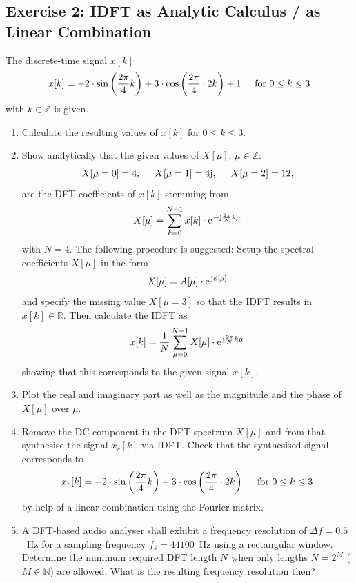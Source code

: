 \documentclass[11pt,a4paper,DIV=12]{scrartcl}
\begin{document}
\subsection*{Exercise 2: IDFT as Analytic Calculus / as Linear Combination}
The discrete-time signal $x[k]$
\begin{equation}
x[k]=-2\cdot\sin\left(\frac{2\pi}{4}k\right)+3\cdot\cos\left(\frac{2\pi}{4}\cdot2k\right)+1
\hspace{5mm}\text{for}\,\,0\leq k\leq3
\end{equation}
with $k\in\mathbb{Z}$ is given.
\begin{enumerate}[label=\alph*)]
	\item Calculate the resulting values of $x[k]$ for $0\leq k\leq3$.
%
	\item Show analytically that the given values of $X[\mu]$, $\mu\in\mathbb{Z}$:
	\begin{equation}
	X[\mu=0]=4, \hspace{5mm} X[\mu=1]=4\im, \hspace{5mm} X[\mu=2]=12,
	\end{equation}
	are the DFT coefficients of $x[k]$ stemming from
	\begin{equation}
	X[\mu]=\sum_{k=0}^{N-1}x[k]\cdot\e^{-\im\frac{2\pi}{N}k\mu}
	\end{equation}
	with $N=4$.
%
	The following procedure is suggested: Setup the spectral
	coefficients $X[\mu]$ in the form
	\begin{equation}
	X[\mu]=A[\mu]\cdot\e^{\im\phi[\mu]}
	\end{equation}
	and specify the missing value $X[\mu=3]$ so that the IDFT results in
	$x[k]\in\mathbb{R}$.
%
	Then calculate the IDFT as
	\begin{equation}
	x[k]=\frac{1}{N}\sum_{\mu=0}^{N-1}X[\mu]\cdot\e^{\im\frac{2\pi}{N}k\mu}
	\end{equation}
	showing that this corresponds to the given signal $x[k]$.
%
	\item Plot the real and imaginary part as well as the magnitude and the phase
	of $X[\mu]$ over $\mu$.
%
	\item
  Remove the DC component in the DFT spectrum $X[\mu]$ and from that synthesise
  the signal $x_r[k]$ via IDFT.
  Check that the synthesised signal corresponds to
  \begin{equation}
  x_r[k]=-2\cdot\sin\left(\frac{2\pi}{4}k\right)+3\cdot\cos\left(\frac{2\pi}{4}\cdot2k\right)
  \hspace{5mm}\text{for}\,\,0\leq k\leq3
  \end{equation}
  by help of a linear combination using the Fourier matrix.
%
	\item A DFT-based audio analyser shall exhibit a frequency resolution of
	$\Delta f=0.5$~Hz for a sampling frequency $f_s=44100$~Hz using a rectangular
	window.
%
	Determine the minimum required DFT length $N$ when only lengths $N=2^M$
	($M\in\mathbb{N}$) are allowed.
%
	What is the resulting frequency resolution then?

\end{enumerate}
\end{document}
